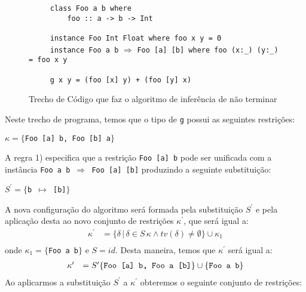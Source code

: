 \begin{figure}[h]
	\begin{flushleft}
\verb|	   class Foo a b where| \\
\verb|	       foo :: a -> b -> Int|\\ 
\verb| |\\	       
\verb|	   instance Foo Int Float where foo x y = 0|\\
\verb|	   instance Foo a b| $\Rightarrow$ \verb|Foo [a] [b] where foo (x:_) (y:_) = foo x y|\\
\verb| |\\	   
\verb|	   g x y = (foo [x] y) + (foo [y] x)|
	\end{flushleft}
	\caption{Trecho de C\'odigo que faz o algoritmo de infer\^encia de \cite{Duggan02a} n\~ao terminar}
	\label{dugganloop}	
\end{figure}
Neste trecho de programa, temos que o tipo de \texttt{g} possui as seguintes restri\c{c}\~oes:
\begin{center}
	$\kappa=\{$\texttt{Foo [a] b, Foo [b] a}$\}$
\end{center}
A regra 1) especifica que a 
restri\c{c}\~ao \texttt{Foo [a] b} pode ser unificada com a inst\^ancia 
\texttt{Foo a b $\Rightarrow$ Foo [a] [b]} produzindo a seguinte substitui\c{c}\~ao:
\begin{center}
	$S^{\prime}=\{$\texttt{b $\mapsto$ [b]}$\}$
\end{center} 
A nova configura\c{c}\~ao do algoritmo ser\'a formada pela substitui\c{c}\~ao $S^{\prime}$ e pela aplica\c{c}\~ao desta
ao novo conjunto de restri\c{c}\~oes $\kappa^{\prime}$, que ser\'a igual a:
\begin{equation*}
	\begin{array}{ll}
		\kappa^{\prime} & = \{\delta\,|\, \delta\in S\,\kappa\land tv(\delta)\neq\emptyset\}\cup\kappa_{1}\\
	\end{array}
\end{equation*} 
onde $\kappa_{1}=\{$\texttt{Foo a b}$\}$ e $S=id$. Desta maneira, temos que $\kappa^{\prime}$ ser\'a igual a:
\begin{equation*}
	\begin{array}{ll}
		\kappa^{\prime} & = S^{\prime}\{\text{\texttt{Foo [a] b, Foo a [b]}}\}\cup\{\text{\texttt{Foo a b}}\}
	\end{array}
\end{equation*}
Ao aplicarmos a substitui\c{c}\~ao $S^{\prime}$ a $\kappa^{\prime}$ obteremos o seguinte conjunto de restri\c{c}\~oes:
